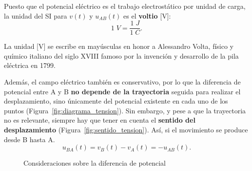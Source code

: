 Puesto que el potencial eléctrico es el trabajo electrostático por
unidad de carga, la unidad del SI para $v(t)$ y $u_{AB}(t)$ es el
\textbf{voltio} [V]:
\begin{equation*}
  1\;V=\dfrac{1\;J}{1\;C}.
\end{equation*}
\begin{remark}
  La unidad [V] se escribe en mayúsculas en honor a Alessandro Volta,
  físico y químico italiano del siglo XVIII famoso por la invención y
  desarrollo de la pila eléctrica en 1799.
\end{remark}
Además, el campo eléctrico también es conservativo, por lo que la
diferencia de potencial entre A y B \textbf{no depende de la
  trayectoria} seguida para realizar el desplazamiento, sino
únicamente del potencial existente en cada uno de los puntos
(Figura~\ref{fig:diagrama_tension}). Sin embargo, y pese a que la
trayectoria no es relevante, siempre hay que tener en cuenta el
\textbf{sentido del desplazamiento}
(Figura~\ref{fig:sentido_tension}). Así, si el movimiento se produce
desde B hasta A.
\begin{equation*}
  u_{BA}(t) = v_B(t) - v_A(t) = - u_{AB}(t). 
\end{equation*}
\begin{figure}[H]
  \centering
  \hfil
  \caption{Consideraciones sobre la diferencia de potencial}
\end{figure}
	
